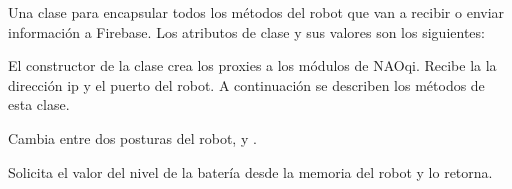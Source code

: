 
Una clase para encapsular todos los métodos del robot
que van a recibir o enviar información a Firebase.
Los atributos de clase y sus valores son los siguientes:

%
\begin{sphinxVerbatim}[commandchars=\\\{\}]
  
  
  
  
  
  
  \PYG{p}{[}
    \PYG{p}{[} \PYG{p}{]}
    \PYG{p}{[} \PYG{p}{]}
    \PYG{p}{[} \PYG{p}{]}
    \PYG{p}{[} \PYG{p}{]}
    \PYG{p}{[} \PYG{p}{]}
\PYG{p}{]}
\end{sphinxVerbatim}

El constructor de la clase crea los proxies a los módulos de NAOqi.
Recibe la la dirección ip y el puerto del robot. A continuación
se describen los métodos de esta clase.

\begin{fulllineitems}
\label{\detokenize{nao_firebase:nao_robot.Robot.change_posture}}
Cambia entre dos posturas del robot,  y .
\end{fulllineitems}


\begin{fulllineitems}
\label{\detokenize{nao_firebase:nao_robot.Robot.get_battery_level}}
Solicita el valor del nivel de la batería desde la memoria del robot
y lo retorna.

\end{fulllineitems}


